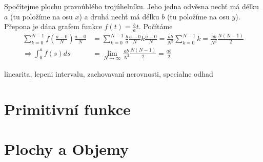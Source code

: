 \begin{příklad}
  Spočítejme plochu pravoúhlého trojúhelníku. Jeho jedna odvěsna nechť má délku $a$ (tu položíme na osu $x$) a druhá nechť má délku $b$ (tu položíme na osu $y$). Přepona je dána grafem funkce $f(t)=\frac{b}{a}t.$ Počítáme
  \begin{align*}
	  \sum_{k=0}^{N-1}f\left(\frac{a-0}{N}\right)\frac{a-0}{N} &= \sum_{k=0}^{N-1}\frac{b}{a}\frac{a-0}{N}k\frac{a-0}{N}=\frac{ab}{N^{2}}\sum_{k=0}^{N-1}k=\frac{ab}{N^{2}}\frac{N(N-1)}{2} \\
	  \Rightarrow \int_0^af(s)ds &= \lim_{N\to \infty}\frac{ab}{N^{2}}\frac{N(N-1)}{2}=\frac{ab}{2} 
  \end{align*}
\end{příklad}

\begin{věta}
  linearita, lepeni intervalu, zachovavani nerovnosti, specialne odhad
\end{věta}

\begin{věta}
  
\end{věta}

\section{Primitivní funkce}
\section{Plochy a Objemy}
